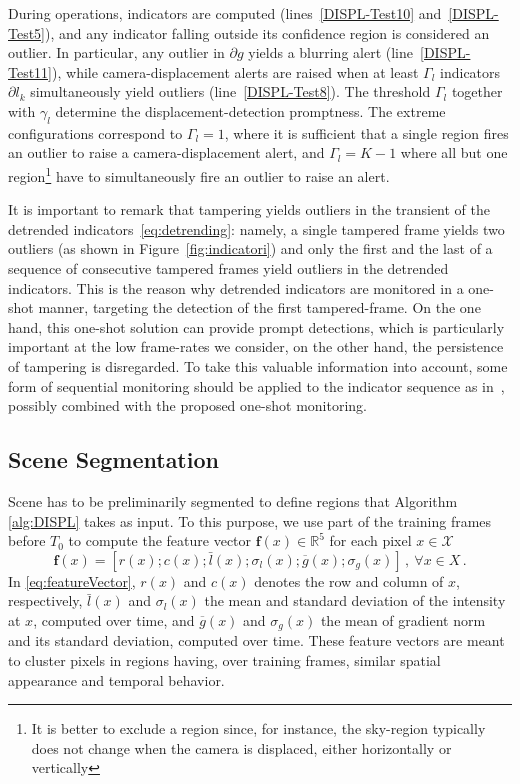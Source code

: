 \documentclass{llncs}
\begin{document}
During operations, indicators are computed (lines~\ref{DISPL-Test10} and~\ref{DISPL-Test5}), and any indicator falling outside its confidence region is considered an outlier. In particular, any outlier in $\partial g$ yields a blurring alert (line~\ref{DISPL-Test11}), while camera-displacement alerts are raised when at least $\Gamma_l$ indicators $\partial l_k$  simultaneously yield outliers (line~\ref{DISPL-Test8}). The threshold $\Gamma_l$ together with $\gamma_l$ determine the displacement-detection promptness. The extreme configurations correspond to $\Gamma_l = 1$, where it is sufficient that a single region fires an outlier to raise a camera-displacement alert, and $\Gamma_l = K-1$ where all but one region\footnote{It is better to exclude a region since, for instance, the sky-region typically does not change when the camera is displaced, either horizontally or vertically} have to simultaneously fire an outlier to raise an alert.

It is important to remark that tampering yields outliers in the transient of the detrended indicators~\eqref{eq:detrending}: namely, a single tampered frame yields two outliers (as shown in Figure~\ref{fig:indicatori}) and only the first and the last of a sequence of consecutive tampered frames yield outliers in the detrended indicators. This is the reason why detrended indicators are monitored in a one-shot manner, targeting the detection of the first tampered-frame. On the one hand, this one-shot solution can provide prompt detections, which is particularly important at the low frame-rates we consider, on the other hand, the persistence of tampering is disregarded. To take this valuable information into account, some form of sequential monitoring should be applied to the indicator sequence as in~\cite{alippi2010detecting}, possibly combined with the proposed one-shot monitoring.
%
%
\subsection{Scene Segmentation}\label{subsec:Segmentation}
Scene has to be preliminarily segmented to define regions that Algorithm \ref{alg:DISPL} takes as input. To this purpose, we use part of the training frames before $T_0$ to compute the feature vector $\textbf{f}(x)\in \mathbb{R}^5$ for each pixel $x\in\mathcal{X}$ 
\begin{equation}
\label{eq:featureVector}
\textbf{f}(x)=\left[r(x);c(x);\bar{l}(x);\sigma_{l}(x);\overline{g}(x);\sigma_{g}(x)\right]\,, \ \forall x \in X\,.
\end{equation}
In \eqref{eq:featureVector}, $r(x)$ and $c(x)$ denotes the row and column of $x$, respectively, $\bar{l}(x)$ and $\sigma_{l}(x)$ the mean and standard deviation of the intensity at $x$, computed over time, and $\overline{g}(x)$ and $\sigma_g(x)$ the mean of gradient norm and its standard deviation, computed over time. These feature vectors are meant to cluster pixels in regions having, over training frames, similar spatial appearance and temporal behavior.
\end{document}

